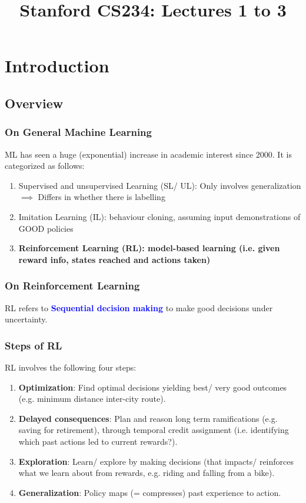 \documentclass{article}
\title{Stanford CS234: Lectures 1 to 3}
\begin{document}
\section{Introduction}

\subsection{Overview}
\subsubsection{On General Machine Learning}
ML has seen a huge (exponential) increase in academic interest since 2000. It is categorized as follows:
\begin{enumerate}
    \item Supervised and unsupervised Learning (SL/ UL): Only involves generalization
    $\implies$ Differs in whether there is labelling
    \item Imitation Learning (IL): behaviour cloning, assuming input demonstrations of GOOD policies
    \item \textbf{Reinforcement Learning (RL): model-based learning (i.e. given reward info, states reached and actions taken)}
\end{enumerate}

\subsubsection{On Reinforcement Learning}
RL refers to \textbf{\textcolor{blue}{Sequential decision making}} to make good decisions under uncertainty.
\begin{defbox}
  \subsubsection*{Steps of RL}
  RL involves the following four steps:
  \begin{enumerate}
  \item \textbf{Optimization}:
      Find optimal decisions yielding best/ very good outcomes (e.g. minimum distance inter-city route).
  \item \textbf{Delayed consequences}:
      Plan and reason long term ramifications (e.g. saving for retirement), through temporal credit assignment (i.e. identifying which past actions led to current rewards?).
  \item \textbf{Exploration}:
      Learn/ explore by making decisions (that impacts/ reinforces what we learn about from rewards, e.g. riding and falling from a bike).
  \item \textbf{Generalization}:
      Policy maps (= compresses) past experience to action.
  \end{enumerate}
\end{defbox}
\end{document}
